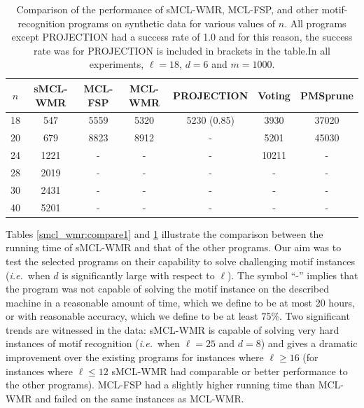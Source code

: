 \begin{table}[h!]
\begin{center} {
	\begin{tabular}{|c|c|c|c|c|c|c|}     
	\hline	
	$n$			& sMCL-WMR	& MCL-FSP		& MCL-WMR		& PROJECTION		& Voting				& PMSprune\\
	\hline
    18			& 547 				& 5559				& 5320				&	5230 (0.85)		& 3930					& 37020 \\
	20  			& 679				& 8823				& 8912				&  -						& 5201					& 45030  \\
	24		  	& 1221 			& -					& -					&	-						& 10211				& - \\
	28			& 2019				& -					& -					&	-						&	-						& - \\
	30			& 2431		 		& -					& -					&	-						&	-						& - \\
	40			& 5201		 		& -					& -					&	-						&	-						& - \\
	\hline
	\end{tabular}}
	\end{center}
	\caption[Comparison of the performance of sMCL-WMR, MCL-FSP, and other motif-recognition programs on synthetic data for various values of $n$.]{Comparison of the performance of sMCL-WMR, MCL-FSP, and other motif-recognition programs on synthetic data for various values of $n$. All programs except PROJECTION had a success rate of 1.0 and for this reason, the success rate was for PROJECTION is included in brackets in the table.In all experiments, $\ell = 18$, $d = 6$ and $m = 1000$.}
\label{smcl_wmr:compare2}
\end{table}
	

Tables \ref{smcl_wmr:compare1} and \ref{smcl_wmr:compare2} illustrate the comparison between the running time of sMCL-WMR and that of the other programs.  Our aim was to test the selected programs on their capability to solve challenging motif instances ({\em i.e.}\ when $d$ is significantly large with respect to $\ell$).  The symbol ``-'' implies that the program was not capable of solving the motif instance on the described machine in a reasonable amount of time, which we define to be at most 20 hours, or with reasonable accuracy, which we define to be at least 75\%.  Two significant trends are witnessed in the data: sMCL-WMR is capable of solving very hard instances of motif recognition ({\em i.e.}\ when $\ell = 25$ and $d = 8$) and gives a dramatic improvement over the existing programs for instances where $\ell \geq 16$ (for instances where $\ell \leq 12$ sMCL-WMR had comparable or better performance to the other programs). MCL-FSP had a slightly higher running time than MCL-WMR and failed on the same instances as MCL-WMR. 


